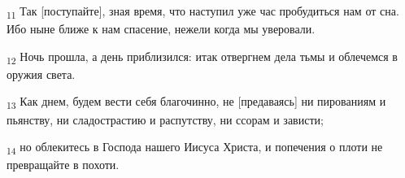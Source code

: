 \begin{tcolorbox}
\textsubscript{11} Так [поступайте], зная время, что наступил уже час пробудиться нам от сна. Ибо ныне ближе к нам спасение, нежели когда мы уверовали.
\end{tcolorbox}
\begin{tcolorbox}
\textsubscript{12} Ночь прошла, а день приблизился: итак отвергнем дела тьмы и облечемся в оружия света.
\end{tcolorbox}
\begin{tcolorbox}
\textsubscript{13} Как днем, будем вести себя благочинно, не [предаваясь] ни пированиям и пьянству, ни сладострастию и распутству, ни ссорам и зависти;
\end{tcolorbox}
\begin{tcolorbox}
\textsubscript{14} но облекитесь в Господа нашего Иисуса Христа, и попечения о плоти не превращайте в похоти.
\end{tcolorbox}
